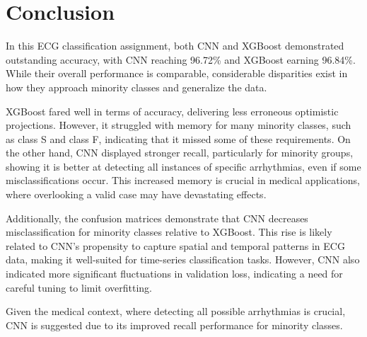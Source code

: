 \section{Conclusion}
\indent \indent In this ECG classification assignment, both CNN and XGBoost demonstrated outstanding accuracy, with CNN reaching 96.72\% and XGBoost earning 96.84\%. While their overall performance is comparable, considerable disparities exist in how they approach minority classes and generalize the data. 

\indent XGBoost fared well in terms of accuracy, delivering less erroneous optimistic projections. However, it struggled with memory for many minority classes, such as class S and class F, indicating that it missed some of these requirements. On the other hand, CNN displayed stronger recall, particularly for minority groups, showing it is better at detecting all instances of specific arrhythmias, even if some misclassifications occur. This increased memory is crucial in medical applications, where overlooking a valid case may have devastating effects. 

\indent Additionally, the confusion matrices demonstrate that CNN decreases misclassification for minority classes relative to XGBoost. This rise is likely related to CNN's propensity to capture spatial and temporal patterns in ECG data, making it well-suited for time-series classification tasks.    However, CNN also indicated more significant fluctuations in validation loss, indicating a need for careful tuning to limit overfitting. 

\indent Given the medical context, where detecting all possible arrhythmias is crucial, CNN is suggested due to its improved recall performance for minority classes. 

\clearpage